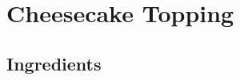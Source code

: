 \thispagestyle{fancy}
\section{Cheesecake Topping}
\AddToShipoutPicture*{\CheesecakeTopping}

\subsection*{Ingredients}